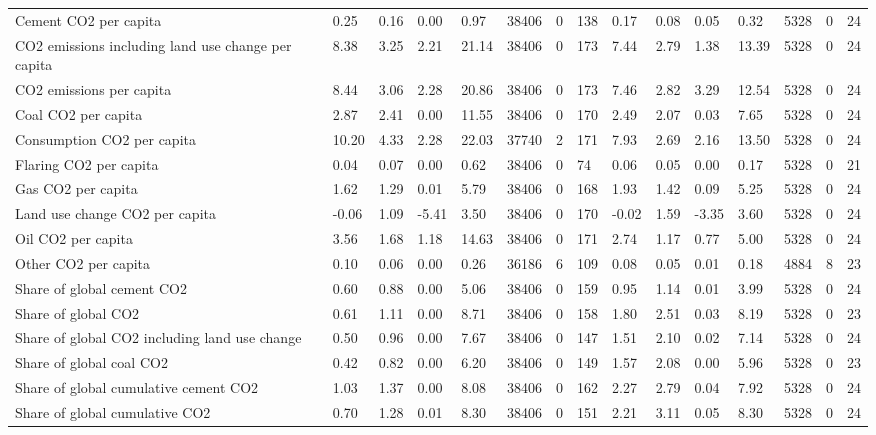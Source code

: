 \begin{longtable}{lllllllllllllll}
Cement CO2 per capita & 0.25 & 0.16 & 0.00 & 0.97 & 38406 & 0 & 138 & 0.17 & 0.08 & 0.05 & 0.32 & 5328 & 0 & 24\\
CO2 emissions including land use change per capita & 8.38 & 3.25 & 2.21 & 21.14 & 38406 & 0 & 173 & 7.44 & 2.79 & 1.38 & 13.39 & 5328 & 0 & 24\\
CO2 emissions per capita & 8.44 & 3.06 & 2.28 & 20.86 & 38406 & 0 & 173 & 7.46 & 2.82 & 3.29 & 12.54 & 5328 & 0 & 24\\
Coal CO2 per capita & 2.87 & 2.41 & 0.00 & 11.55 & 38406 & 0 & 170 & 2.49 & 2.07 & 0.03 & 7.65 & 5328 & 0 & 24\\
\addlinespace
Consumption CO2 per capita & 10.20 & 4.33 & 2.28 & 22.03 & 37740 & 2 & 171 & 7.93 & 2.69 & 2.16 & 13.50 & 5328 & 0 & 24\\
Flaring CO2 per capita & 0.04 & 0.07 & 0.00 & 0.62 & 38406 & 0 & 74 & 0.06 & 0.05 & 0.00 & 0.17 & 5328 & 0 & 21\\
Gas CO2 per capita & 1.62 & 1.29 & 0.01 & 5.79 & 38406 & 0 & 168 & 1.93 & 1.42 & 0.09 & 5.25 & 5328 & 0 & 24\\
Land use change CO2 per capita & -0.06 & 1.09 & -5.41 & 3.50 & 38406 & 0 & 170 & -0.02 & 1.59 & -3.35 & 3.60 & 5328 & 0 & 24\\
Oil CO2 per capita & 3.56 & 1.68 & 1.18 & 14.63 & 38406 & 0 & 171 & 2.74 & 1.17 & 0.77 & 5.00 & 5328 & 0 & 24\\
\addlinespace
Other CO2 per capita & 0.10 & 0.06 & 0.00 & 0.26 & 36186 & 6 & 109 & 0.08 & 0.05 & 0.01 & 0.18 & 4884 & 8 & 23\\
Share of global cement CO2 & 0.60 & 0.88 & 0.00 & 5.06 & 38406 & 0 & 159 & 0.95 & 1.14 & 0.01 & 3.99 & 5328 & 0 & 24\\
Share of global CO2 & 0.61 & 1.11 & 0.00 & 8.71 & 38406 & 0 & 158 & 1.80 & 2.51 & 0.03 & 8.19 & 5328 & 0 & 23\\
Share of global CO2 including land use change & 0.50 & 0.96 & 0.00 & 7.67 & 38406 & 0 & 147 & 1.51 & 2.10 & 0.02 & 7.14 & 5328 & 0 & 24\\
Share of global coal CO2 & 0.42 & 0.82 & 0.00 & 6.20 & 38406 & 0 & 149 & 1.57 & 2.08 & 0.00 & 5.96 & 5328 & 0 & 23\\
\addlinespace
Share of global cumulative cement CO2 & 1.03 & 1.37 & 0.00 & 8.08 & 38406 & 0 & 162 & 2.27 & 2.79 & 0.04 & 7.92 & 5328 & 0 & 24\\
Share of global cumulative CO2 & 0.70 & 1.28 & 0.01 & 8.30 & 38406 & 0 & 151 & 2.21 & 3.11 & 0.05 & 8.30 & 5328 & 0 & 24\\

\end{longtable}
